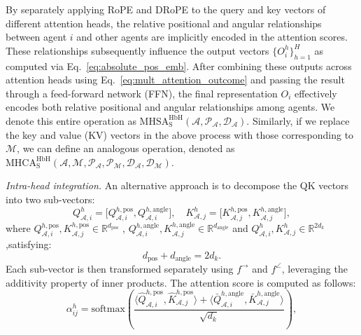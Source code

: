 \documentclass[lettersize,journal]{IEEEtran}
\theoremstyle{definition}
\begin{document}
By separately applying RoPE and DRoPE to the query and key vectors of different attention heads, the relative positional and angular relationships between agent $i$ and other agents are implicitly encoded in the attention scores. These relationships subsequently influence the output vectors $\{O_i^h\}_{h=1}^{H}$ as computed via Eq.~\eqref{eq:absolute_pos_emb}. After combining these outputs across attention heads using Eq.~\eqref{eq:mult_attention_outcome} and passing the result through a feed-forward network (FFN), the final representation \( O_i \) effectively encodes both relative positional and angular relationships among agents. We denote this entire operation as $\text{MHSA}_\text{S}^\text{HbH}(\mathcal{A}, \mathcal{P}_\mathcal{A}, \mathcal{D}_\mathcal{A})$. 
Similarly, if we replace the key and value (KV) vectors in the above process with those corresponding to \(\mathcal{M}\), we can define an analogous operation, denoted as 
\( \text{MHCA}_\text{S}^\text{HbH}(\mathcal{A}, \mathcal{M}, \mathcal{P}_\mathcal{A}, \mathcal{P}_\mathcal{M}, \mathcal{D}_\mathcal{A}, \mathcal{D}_\mathcal{M}) \).

\noindent\textit{Intra-head integration.} \quad 
An alternative approach is to decompose the QK vectors into two sub-vectors:
\begin{equation}
Q_{\mathcal{A},i}^h = \big[ Q_{\mathcal{A},i}^{h,\text{pos}}, Q_{\mathcal{A},i}^{h,\text{angle}} \big], \quad
K_{\mathcal{A},j}^h = \big[ K_{\mathcal{A},j}^{h,\text{pos}}, K_{\mathcal{A},j}^{h,\text{angle}} \big],
\end{equation}
where \( Q_{\mathcal{A},i}^{h,\text{pos}}, K_{\mathcal{A},j}^{h,\text{pos}} \in \mathbb{R}^{d_{\text{pos}}} \) , \( Q_{\mathcal{A},i}^{h,\text{angle}}, K_{\mathcal{A},j}^{h,\text{angle}} \in \mathbb{R}^{d_{\text{angle}}} \) and \( Q_{\mathcal{A},i}^{h}, K_{\mathcal{A},j}^{h} \in \mathbb{R}^{2d_k} \),satisfying:
\begin{equation}
d_{\text{pos}} + d_{\text{angle}} = 2d_k.
\end{equation}
Each sub-vector is then transformed separately using \( f^{\rightarrow} \) and \( f^\angle \), leveraging the additivity property of inner products. The attention score is computed as follows:
\begin{equation}
\alpha_{ij}^h = \mathrm{softmax} \left(
\frac{ \langle \hat{Q}_{\mathcal{A},i}^{h,\text{pos}}, \hat{K}_{\mathcal{A},j}^{h,\text{pos}} \rangle 
+ \langle \bar{Q}_{\mathcal{A},i}^{h,\text{angle}}, \bar{K}_{\mathcal{A},j}^{h,\text{angle}} \rangle }{\sqrt{d_k}}
\right),
\end{equation}
\end{document}
